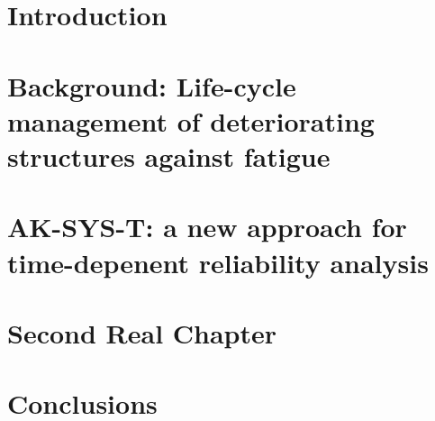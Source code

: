 \documentclass[a4paper,12pt,oneside]{report}
\begin{document}
\renewcommand{\baselinestretch}{1.5}\normalsize

\chapter{Introduction}\label{chapter:introduction}
\setcounter{page}{0}


\clearemptydoublepage

\chapter{Background: Life-cycle management of deteriorating structures against fatigue}\label{chapter:ch2}


\clearemptydoublepage

\chapter{AK-SYS-T: a new approach for time-depenent reliability analysis}\label{chapter:ch3}


\clearemptydoublepage

\chapter{Second Real Chapter}\label{chapter:ch4}


\clearemptydoublepage

\chapter{Conclusions}\label{chapter:conclusions}


\clearemptydoublepage

%



\clearemptydoublepage

\appendix
{}


\end{document}
